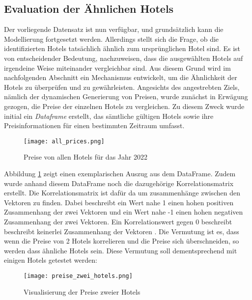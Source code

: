 \subsection{Evaluation der Ähnlichen Hotels}
\label{subsec:Evaluation_1}
Der vorliegende Datensatz ist nun verfügbar, und grundsätzlich kann die Modellierung fortgesetzt werden. Allerdings stellt sich die Frage, ob die identifizierten Hotels tatsächlich ähnlich zum ursprünglichen Hotel sind. Es ist von entscheidender Bedeutung, nachzuweisen, dass die ausgewählten Hotels auf irgendeine Weise miteinander vergleichbar sind. Aus diesem Grund wird im nachfolgenden Abschnitt ein Mechanismus entwickelt, um die Ähnlichkeit der Hotels zu überprüfen und zu gewährleisten.
\newline
\newline
Angesichts des angestrebten Ziels, nämlich der dynamischen Generierung von Preisen, wurde zunächst in Erwägung gezogen, die Preise der einzelnen Hotels zu vergleichen. Zu diesem Zweck wurde initial ein \emph{Dataframe} erstellt, das sämtliche gültigen Hotels sowie ihre Preisinformationen für einen bestimmten Zeitraum umfasst.
\newpage
\begin{figure}[h]
    \centering
    \texttt{[image: all\_prices.png]}
    \caption[Preise von allen Hotels für das Jahr 2022]{Preise von allen Hotels für das Jahr 2022}
    \label{img:all_prices}
\end{figure}

Abbildung \ref{img:all_prices} zeigt einen exemplarischen Auszug aus dem DataFrame. Zudem wurde anhand diesem DataFrame noch die dazugehörige Korrelationsmatrix erstellt. Die Korrelationsmatrix ist dafür da um zusammenhänge zwischen den Vektoren zu finden. Dabei beschreibt ein Wert nahe 1 einen hohen positiven Zusammenhang der zwei Vektoren und ein Wert nahe -1 einen hohen negativen Zusammenhang der zwei Vektoren. Ein Korrelationswert gegen 0 beschreibt beschreibt keinerlei Zusammenhang der Vektoren \cite{Team.03.05.2020}. Die Vermutung ist es, dass wenn die Preise von 2 Hotels korrelieren und die Preise sich überschneiden, so werden dass ähnliche Hotels sein. 
\newline
\newline
Diese Vermutung soll dementsprechend mit einigen Hotels getestet werden:
\begin{figure}[h]
    \centering
    \texttt{[image: preise\_zwei\_hotels.png]}
    \caption[Visualisierung der Preise zweier Hotels]{Visualisierung der Preise zweier Hotels}
    \label{img:preise_zwei_hotels}
\end{figure}

